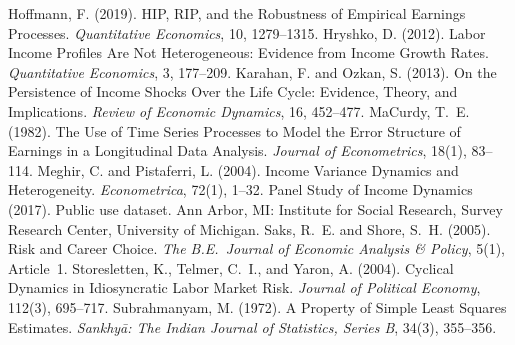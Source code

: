 \documentclass[12pt]{article}
\begin{document}
\begin{thebibliography}{99}
 Hoffmann, F. (2019). HIP, RIP, and the Robustness of Empirical Earnings Processes. \textit{Quantitative Economics}, 10, 1279--1315.
 Hryshko, D. (2012). Labor Income Profiles Are Not Heterogeneous: Evidence from Income Growth Rates. \textit{Quantitative Economics}, 3, 177--209.
 Karahan, F. and Ozkan, S. (2013). On the Persistence of Income Shocks Over the Life Cycle: Evidence, Theory, and Implications. \textit{Review of Economic Dynamics}, 16, 452--477.
 MaCurdy, T.~E. (1982). The Use of Time Series Processes to Model the Error Structure of Earnings in a Longitudinal Data Analysis. \textit{Journal of Econometrics}, 18(1), 83--114.
 Meghir, C. and Pistaferri, L. (2004). Income Variance Dynamics and Heterogeneity. \textit{Econometrica}, 72(1), 1--32.
 Panel Study of Income Dynamics (2017). Public use dataset. Ann Arbor, MI: Institute for Social Research, Survey Research Center, University of Michigan.
 Saks, R.~E. and Shore, S.~H. (2005). Risk and Career Choice. \textit{The B.E.\ Journal of Economic Analysis \& Policy}, 5(1), Article~1.
 Storesletten, K., Telmer, C.~I., and Yaron, A. (2004). Cyclical Dynamics in Idiosyncratic Labor Market Risk. \textit{Journal of Political Economy}, 112(3), 695--717.
 Subrahmanyam, M. (1972). A Property of Simple Least Squares Estimates. \textit{Sankhy\=a: The Indian Journal of Statistics, Series B}, 34(3), 355--356.


\end{thebibliography}
\end{document}
